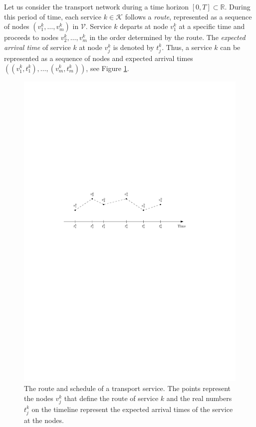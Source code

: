 \documentclass[dissertation,draft*]{aaltoseries}
\begin{document}
Let us consider the transport network during a time horizon $[0,T] \subset \mathbb{R}$.
During this period of time, each service $k \in \mathcal{K}$ follows a \emph{route}, 
represented as a sequence of nodes $(v_1^k,\ldots,v_m^k)$ in $\mathcal{V}$. 
Service $k$ departs at node $v_1^k$ at a specific time and proceeds to nodes $v_2^k, \ldots,v_m^k$ in the order determined by the route.
The \emph{expected arrival time} of service $k$ at node $v_j^k$ is denoted by $t_j^k$.
Thus, a service $k$ can be represented as a sequence of nodes and expected arrival 
times $((v_1^k, t_1^k), \ldots, (v_m^k, t_m^k))$, see Figure \ref{stokvsdet02}.

\begin{figure}[ht]
\begin{center}
\includegraphics[width=0.8\columnwidth]{stokvsdet02b}
\end{center}
\caption{The route and schedule of a transport service. The points represent the nodes $v_j^k$ that define 
the route of service $k$ and the real numbers $t_j^k$ on the timeline represent the expected arrival
times of the service at the nodes.}
\label{stokvsdet02}
\end{figure}
\end{document}

